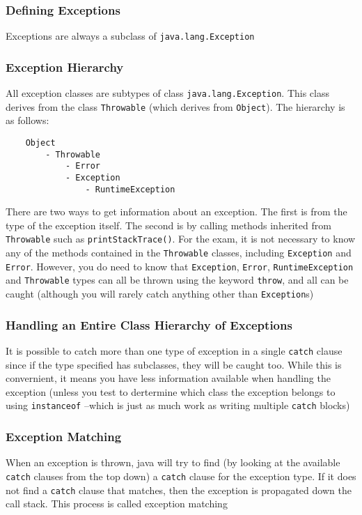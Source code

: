 \subsubsection{Defining Exceptions}
Exceptions are always a subclass of \verb#java.lang.Exception#

\subsubsection{Exception Hierarchy}
All exception classes are subtypes of class \verb#java.lang.Exception#. This 
class derives from the class \verb#Throwable# (which derives from 
\verb#Object#). The hierarchy is as follows:
\begin{verbatim}
    Object
        - Throwable
            - Error
            - Exception
                - RuntimeException
\end{verbatim}
There are two ways to get information about an exception. The first is from the 
type of the exception itself. The second is by calling methods inherited from 
\verb#Throwable# such as \verb#printStackTrace()#. For the exam, it is not 
necessary to know any of the methods contained in the \verb#Throwable# classes, 
including \verb#Exception# and \verb#Error#. However, you do need to know that 
\verb#Exception#, \verb#Error#, \verb#RuntimeException# and \verb#Throwable# 
types can all be thrown using the keyword \verb#throw#, and all can be caught 
(although you will rarely catch anything other than \verb#Exception#s)

\subsubsection{Handling an Entire Class Hierarchy of Exceptions}
It is possible to catch more than one type of exception in a single 
\verb#catch# clause since if the type specified has subclasses, they will be 
caught too. While this is convernient, it means you have less information 
available when handling the exception (unless you test to dertermine which 
class the exception belongs to using \verb#instanceof# --which is just as much 
work as writing multiple \verb#catch# blocks)

\subsubsection{Exception Matching}
When an exception is thrown, java will try to find (by looking at the available 
\verb#catch# clauses from the top down) a \verb#catch# clause for the exception 
type. If it does not find a \verb#catch# clause that matches, then the 
exception is propagated down the call stack. This process is called exception 
matching

